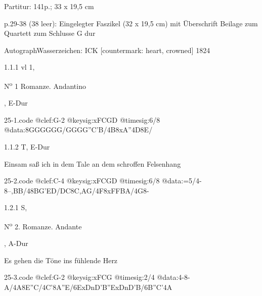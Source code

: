 \documentclass[a4paper, twocolumn, 11pt]{book}
\begin{document}
\par \textcolor{darkblue}{}  Partitur: 141p.; 33 x 19,5 cm\newline \begin{small} p.29-38 (38 leer): Eingelegter Faszikel (32 x 19,5 cm) mit Überschrift {\textquotedbl}Beilage zum Quartett zum Schlusse G dur{\textquotedbl}\end{small} \newline Autograph\newline Wasserzeichen: ICK [countermark: heart, crowned]  1824
\par 1.1.1  vl 1, \begin{itshape}N\textsuperscript{o} 1 Romanze. Andantino\end{itshape}, E-Dur  
\begin{filecontents*}{25-1.code}
@clef:G-2
@keysig:xFCGD
@timesig:6/8
@data:{8GGG}{GGG}/{GGG}{G''C'B}/4B8xA''4D8E/
\end{filecontents*}

\newline %
\par 1.1.2  T, E-Dur\newline \begin{footnotesize} Einsam saß ich in dem Tale an dem schroffen Felsenhang \end{footnotesize}  
\begin{filecontents*}{25-2.code}
@clef:C-4
@keysig:xFCGD
@timesig:6/8
@data:=5/4-8--,BB/48BG'ED/DC{8C,AG}/4F8xF{FBA}/4G8-
\end{filecontents*}

\newline %
\par 1.2.1  S, \begin{itshape}N\textsuperscript{o} 2. Romanze. Andante\end{itshape}, A-Dur\newline \begin{footnotesize} Es gehen die Töne ins fühlende Herz \end{footnotesize}  
\begin{filecontents*}{25-3.code}
@clef:G-2
@keysig:xFCG
@timesig:2/4
@data:4-8-A/4A8E''C/4C'8A''E/{6ExDnD'B}{''ExDnD'B}/{6B''C}'4A
\end{filecontents*}
\end{document}
